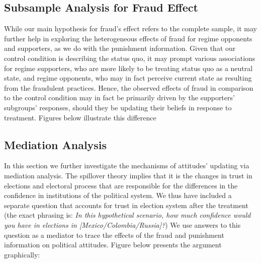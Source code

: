 \documentclass[11pt, ngerman,english,a4]{article}
\begin{document}
\clearpage
\subsection*{Subsample Analysis for Fraud Effect}

While our main hypothesis for fraud's effect refers to the complete sample, it may further help in exploring the heterogeneous effects of fraud for regime opponents and supporters, as we do with the punishment information. Given that our control condition is describing the status quo, it may prompt various associations for regime supporters, who are more likely to be treating status quo as a neutral state, and regime opponents, who may in fact perceive current state as resulting from the fraudulent practices. Hence, the observed effects of fraud in comparison to the control condition may in fact be primarily driven by the supporters' subgroups' responses, should they be updating their beliefs in response to treatment. Figures below illustrate this difference



    
\clearpage
\subsection*{Mediation Analysis}

\onehalfspacing
In this section we further investigate the mechanisms of attitudes' updating via mediation analysis. The spillover theory implies that it is the changes in trust in elections and electoral process that are responsible for the differences in the confidence in institutions of the political system. We thus have included a separate question that accounts for trust in election system after the treatment (the exact phrasing is: \textit{In this hypothetical scenario, how much confidence would you have in elections in [Mexico/Colombia/Russia]?}) We use answers to this question as a mediator to trace the effects of the fraud and punishment information on political attitudes. Figure below presents the argument graphically:

\\

\begin{figure}[H]
	\centering
\end{figure}
\end{document}
